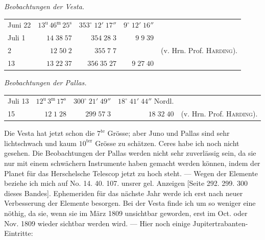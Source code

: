 \begin{center}\emph{Beobachtungen der Vesta.}\end{center}

\begin{center}\fontsize{9}{12}\selectfont\setlength{\tabcolsep}{3pt}\renewcommand{\arraystretch}{1.15}\begin{tabular}{lrrrl}
Juni 22 & $13^{\text{u}}\,46^{\text{m}}\,25^{\text{s}}$ & $353^\circ\;12'\;17''$ & $9^\circ\;12'\;16''$ & \\
Juli 1 & $14\;38\;57$ & $354\;28\;3$ & $9\;9\;39$ & \\
2 & $12\;50\;2$ & $355\;7\;7$ & & (v. Hrn. Prof. \textsc{Harding}).\\
13 & $13\;22\;37$ & $356\;35\;27$ & $9\;27\;40$ & \\
\end{tabular}\end{center}

\begin{center}\emph{Beobachtungen der Pallas.}\end{center}

\begin{center}\fontsize{9}{12}\selectfont\setlength{\tabcolsep}{3pt}\renewcommand{\arraystretch}{1.15}\begin{tabular}{lrrrl}
Juli 13 & $12^{\text{u}}\,3^{\text{m}}\,17^{\text{s}}$ & $300^\circ\;21'\;49''$ & $18^\circ\;41'\;44''$ Nordl. & \\
15 & $12\;1\;28$ & $299\;57\;3$ & $18\;32\;40$ & (v. Hrn. Prof. \textsc{Harding}).\\
\end{tabular}\end{center}

\par\indent Die Vesta hat jetzt schon die $7^{\text{te}}$ Grösse; aber Juno und Pallas sind sehr
lichtschwach und kaum $10^{\text{ter}}$ Grösse zu schätzen. Ceres habe ich noch nicht
gesehen. Die Beobachtungen der Pallas werden nicht sehr zuverlässig sein, da sie nur mit
einem schwächern Instrumente haben gemacht werden können, indem der Planet für das
Herschelsche Telescop jetzt zu hoch steht. --- Wegen der Elemente beziehe ich mich auf
No. 14. 40. 107. unsrer gel. Anzeigen [Seite 292. 299. 300 dieses Bandes]. Ephemeriden für
das nächste Jahr werde ich erst nach neuer Verbesserung der Elemente besorgen. Bei der
Vesta finde ich um so weniger eine nöthig, da sie, wenn sie im März 1809 unsichtbar
geworden, erst im Oct. oder Nov. 1809 wieder sichtbar werden wird. --- Hier noch einige
Jupitertrabanten-Eintritte:

